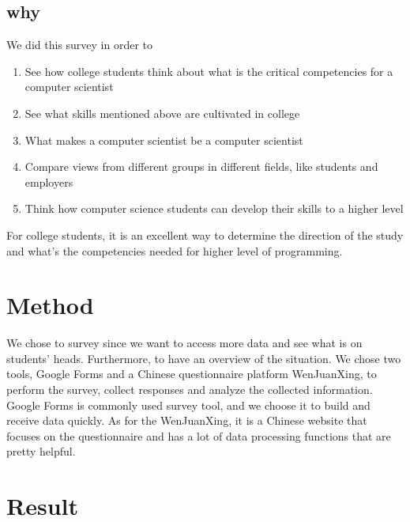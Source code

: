 \documentclass[conference]{IEEEtran}
\begin{document}
\subsection{why}
\par We did this survey in order to 
\begin{enumerate}
    \item See how college students think about what is the critical competencies for a computer scientist
    \item See what skills mentioned above are cultivated in college
    \item What makes a computer scientist be a computer scientist
    \item Compare views from different groups in different fields, like students and
    employers
    \item Think how computer science students can develop their skills to a higher level
\end{enumerate}
\par For college students, it is an excellent way to determine the direction of the study and what's the competencies needed for higher level of programming.

\section{Method}
We chose to survey since we want to access more data and see what is on students' heads. Furthermore, to have an overview of the situation.
We chose two tools, Google Forms and a Chinese questionnaire platform WenJuanXing, to perform the survey, collect responses and analyze the collected information. Google Forms is commonly used survey tool, and we choose it to build and receive data quickly. As for the WenJuanXing, it is a Chinese website that focuses on the questionnaire and has a lot of data processing functions that are pretty helpful.

\section{Result}
\end{document}
